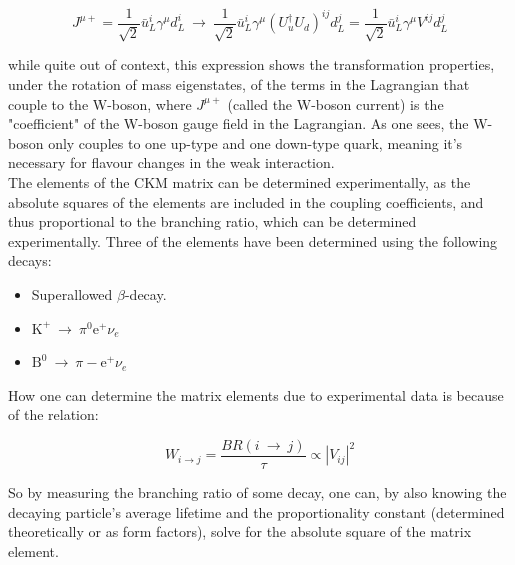 \documentclass[11pt,a4paper]{article}
\begin{document}
\begin{equation}
J^{\mu+} = \frac{1}{\sqrt{2}}\bar{u}_L^i\gamma^\mu d_L^i \:\rightarrow\: \frac{1}{\sqrt{2}}\bar{u}_L^i\gamma^\mu (U_u^\dagger U_d)^{ij}d_L^j = 
\frac{1}{\sqrt{2}}\bar{u}_L^i\gamma^\mu V^{ij}d_L^j
\end{equation}

while quite out of context, this expression shows the transformation properties, under the rotation of mass eigenstates, of the terms in the Lagrangian that couple to the W-boson, where $J^{\mu+}$ (called the W-boson current) is the "coefficient" of the W-boson gauge field in the Lagrangian. As one sees, the W-boson only couples to one up-type and one down-type quark, meaning it's necessary for flavour changes in the weak interaction.\\

The elements of the CKM matrix can be determined experimentally, as the absolute squares of the elements are included in the coupling coefficients, and thus proportional to the branching ratio, which can be determined experimentally. Three of the elements have been determined using the following decays:

\begin{itemize}\centering
	\item Superallowed $\beta$-decay.
	\item $\text{K}^+ \:\rightarrow\: \pi^0\text{e}^+\nu_e$\\
	\item $\text{B}^0 \:\rightarrow\: \pi-\text{e}^+\nu_e$
\end{itemize}

How one can determine the matrix elements due to experimental data is because of the relation:

\begin{equation}
W_{i\rightarrow j} = \frac{BR(i \:\rightarrow\: j)}{\tau} \propto |V_{ij}|^2
\end{equation}

So by measuring the branching ratio of some decay, one can, by also knowing the decaying particle's average lifetime and the proportionality constant (determined theoretically or as form factors), solve for the absolute square of the matrix element.
\end{document}
